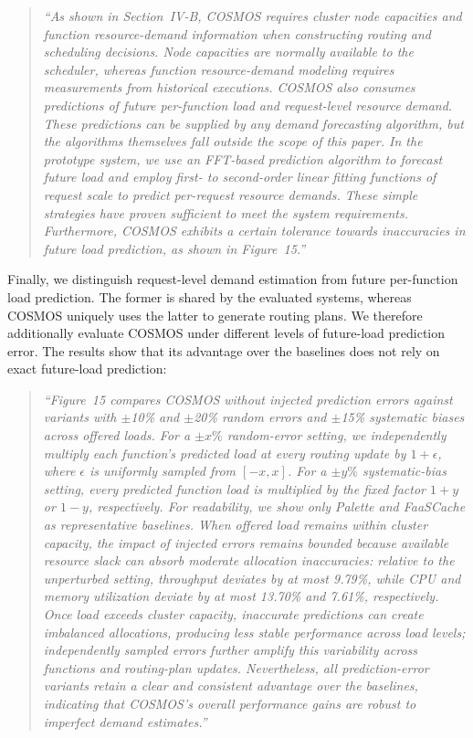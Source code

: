 \documentclass[11pt]{article}
\newenvironment{revisionquote}{\begin{quote}\itshape}{\end{quote}}
\begin{document}
\begin{revisionquote}
``As shown in Section~IV-B, COSMOS requires cluster node capacities and function resource-demand information when constructing routing and scheduling decisions. Node capacities are normally available to the scheduler, whereas function resource-demand modeling requires measurements from historical executions. COSMOS also consumes predictions of future per-function load and request-level resource demand. These predictions can be supplied by any demand forecasting algorithm, but the algorithms themselves fall outside the scope of this paper. In the prototype system, we use an FFT-based prediction algorithm to forecast future load and employ first- to second-order linear fitting functions of request scale to predict per-request resource demands. These simple strategies have proven sufficient to meet the system requirements. Furthermore, COSMOS exhibits a certain tolerance towards inaccuracies in future load prediction, as shown in Figure~15.''
\end{revisionquote}

Finally, we distinguish request-level demand estimation from future per-function load prediction. The former is shared by the evaluated systems, whereas COSMOS uniquely uses the latter to generate routing plans. We therefore additionally evaluate COSMOS under different levels of future-load prediction error. The results show that its advantage over the baselines does not rely on exact future-load prediction:

\begin{revisionquote}
``Figure~15 compares COSMOS without injected prediction errors against variants with $\pm$10\% and $\pm$20\% random errors and $\pm$15\% systematic biases across offered loads. For a $\pm x\%$ random-error setting, we independently multiply each function's predicted load at every routing update by $1+\epsilon$, where $\epsilon$ is uniformly sampled from $[-x,x]$. For a $\pm y\%$ systematic-bias setting, every predicted function load is multiplied by the fixed factor $1+y$ or $1-y$, respectively. For readability, we show only Palette and FaaSCache as representative baselines. When offered load remains within cluster capacity, the impact of injected errors remains bounded because available resource slack can absorb moderate allocation inaccuracies: relative to the unperturbed setting, throughput deviates by at most 9.79\%, while CPU and memory utilization deviate by at most 13.70\% and 7.61\%, respectively. Once load exceeds cluster capacity, inaccurate predictions can create imbalanced allocations, producing less stable performance across load levels; independently sampled errors further amplify this variability across functions and routing-plan updates. Nevertheless, all prediction-error variants retain a clear and consistent advantage over the baselines, indicating that COSMOS's overall performance gains are robust to imperfect demand estimates.''
\end{revisionquote}
\end{document}
